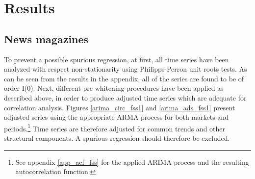 \documentclass[12pt,a4paper,notitlepage]{article}
\begin{document}

\section{Results}

\subsection{News magazines}

To prevent a possible spurious regression, at first, all time series have been analyzed with respect non-stationarity using Philipps-Perron unit roots tests. As can be seen from the results in the appendix, all of the series are found to be of order I(0). Next, different pre-whitening procedures have been applied as described above, in order to produce adjusted time series which are adequate for correlation analysis. Figures \ref{arima_circ_fss1} and \ref{arima_ads_fss1} present adjusted series using the appropriate ARMA process for both markets and periods.\footnote{See appendix \ref{app_acf_fss} for the applied ARIMA process and the resulting autocorrelation function.} Time series are therefore adjusted for common trends and other structural components. A spurious regression should therefore be excluded.  

%	
%	
%
%	
%	
\end{document}
